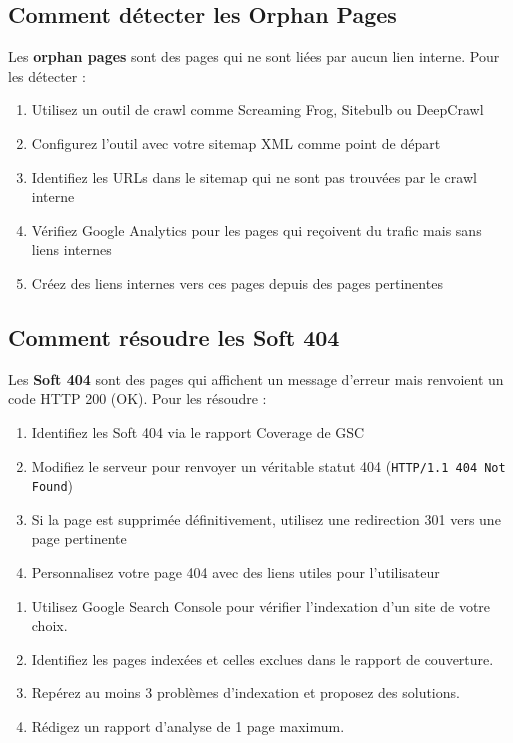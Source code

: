 \documentclass[12pt,a4paper,twoside]{report}
\newcommand{\keyword}[1]{\textbf{\textcolor{googleblue}{#1}}}
\newcommand{\important}[1]{\textbf{\textcolor{googlered}{#1}}}
\begin{document}
\subsection{Comment détecter les Orphan Pages}

Les \keyword{orphan pages} sont des pages qui ne sont liées par aucun lien interne. Pour les détecter :

\begin{enumerate}
    \item Utilisez un outil de crawl comme Screaming Frog, Sitebulb ou DeepCrawl
    \item Configurez l'outil avec votre sitemap XML comme point de départ
    \item Identifiez les URLs dans le sitemap qui ne sont pas trouvées par le crawl interne
    \item Vérifiez Google Analytics pour les pages qui reçoivent du trafic mais sans liens internes
    \item Créez des liens internes vers ces pages depuis des pages pertinentes
\end{enumerate}

\subsection{Comment résoudre les Soft 404}

Les \important{Soft 404} sont des pages qui affichent un message d'erreur mais renvoient un code HTTP 200 (OK). Pour les résoudre :

\begin{enumerate}
    \item Identifiez les Soft 404 via le rapport Coverage de GSC
    \item Modifiez le serveur pour renvoyer un véritable statut 404 (\texttt{HTTP/1.1 404 Not Found})
    \item Si la page est supprimée définitivement, utilisez une redirection 301 vers une page pertinente
    \item Personnalisez votre page 404 avec des liens utiles pour l'utilisateur
\end{enumerate}


\begin{exercise}
\begin{enumerate}
    \item Utilisez Google Search Console pour vérifier l'indexation d'un site de votre choix.
    \item Identifiez les pages indexées et celles exclues dans le rapport de couverture.
    \item Repérez au moins 3 problèmes d'indexation et proposez des solutions.
    \item Rédigez un rapport d'analyse de 1 page maximum.
\end{enumerate}
\end{exercise}
\end{document}
